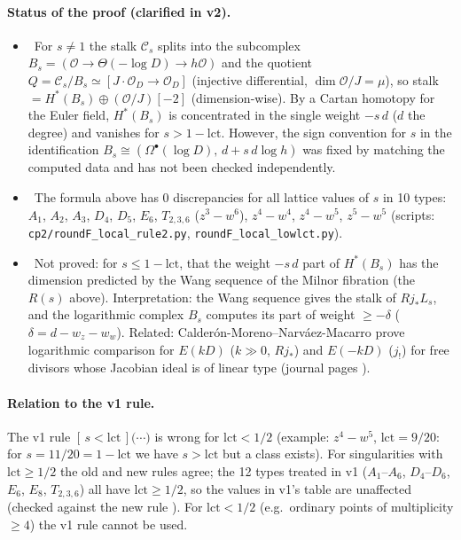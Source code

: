 \paragraph{Status of the proof (clarified in v2).}
\begin{itemize}
\item \tP\ For $s\ne1$ the stalk $\mathcal C_s$ splits into the subcomplex $B_s=(\mathcal O\to\Theta(-\log D)\to h\mathcal O)$ and the quotient $Q=\mathcal C_s/B_s\simeq[J\!\cdot\!\mathcal O_D\to\mathcal O_D]$ (injective differential, $\dim\mathcal O/J=\mu$), so stalk $=H^*(B_s)\oplus(\mathcal O/J)[-2]$ (dimension-wise). By a Cartan homotopy for the Euler field, $H^*(B_s)$ is concentrated in the single weight $-s\,d$ ($d$ the degree) and vanishes for $s>1-\mathrm{lct}$. However, the sign convention for $s$ in the identification $B_s\cong(\Omega^\bullet(\log D),\,d+s\,d\log h)$ was fixed by matching the computed data and has not been checked independently.
\item \tV\ The formula above has 0 discrepancies for all lattice values of $s$ in 10 types: $A_1$, $A_2$, $A_3$, $D_4$, $D_5$, $E_6$, $T_{2,3,6}$ ($z^3-w^6$), $z^4-w^4$, $z^4-w^5$, $z^5-w^5$ (scripts: \texttt{cp2/roundF\_local\_rule2.py}, \texttt{roundF\_local\_lowlct.py}).
\item \tK\ Not proved: for $s\le1-\mathrm{lct}$, that the weight $-s\,d$ part of $H^*(B_s)$ has the dimension predicted by the Wang sequence of the Milnor fibration (the $R(s)$ above). Interpretation: the Wang sequence gives the stalk of $Rj_*L_s$, and the logarithmic complex $B_s$ computes its part of weight $\ge-\delta$ ($\delta=d-w_z-w_w$). Related: Calder\'on-Moreno--Narv\'aez-Macarro \cite{CMNM} prove logarithmic comparison for $E(kD)$ ($k\gg0$, $Rj_*$) and $E(-kD)$ ($j_!$) for free divisors whose Jacobian ideal is of linear type (journal pages \tQ).
\end{itemize}
\paragraph{Relation to the v1 rule.}The v1 rule $[\,s<\mathrm{lct}\,]\bigl(\cdots\bigr)$ is wrong for $\mathrm{lct}<1/2$ (example: $z^4-w^5$, $\mathrm{lct}=9/20$: for $s=11/20=1-\mathrm{lct}$ we have $s>\mathrm{lct}$ but a class exists). For singularities with $\mathrm{lct}\ge1/2$ the old and new rules agree; the 12 types treated in v1 ($A_1$--$A_6$, $D_4$--$D_6$, $E_6$, $E_8$, $T_{2,3,6}$) all have $\mathrm{lct}\ge1/2$, so the values in v1's table are unaffected (checked against the new rule \tV). For $\mathrm{lct}<1/2$ (e.g.\ ordinary points of multiplicity $\ge4$) the v1 rule cannot be used.

